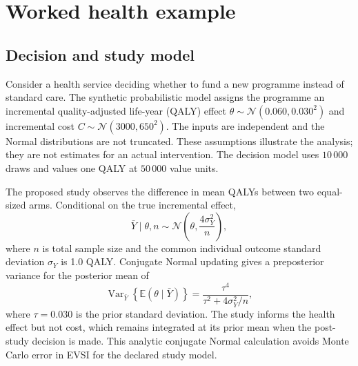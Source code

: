 \section{Worked health example}

\subsection{Decision and study model}

Consider a health service deciding whether to fund a new programme instead of
standard care. The synthetic probabilistic model assigns the programme an
incremental quality-adjusted life-year (QALY) effect
$\theta\sim\mathcal{N}(0.060,0.030^2)$ and incremental cost
$C\sim\mathcal{N}(3000,650^2)$. The inputs are independent and the Normal
distributions are not truncated. These assumptions illustrate the analysis;
they are not estimates for an actual intervention. The decision model uses
$10\,000$ draws and values one QALY at $50\,000$ value units.

The proposed study observes the difference in mean QALYs between two
equal-sized arms. Conditional on the true incremental effect,
\begin{equation}\label{eq:health-likelihood}
  \bar{Y}\mid\theta,n \sim
  \mathcal{N}\!\left(\theta,\frac{4\sigma_Y^2}{n}\right),
\end{equation}
where $n$ is total sample size and the common individual outcome standard
deviation $\sigma_Y$ is 1.0 QALY\@. Conjugate Normal updating gives a
preposterior variance for the posterior mean of
\begin{equation}\label{eq:health-preposterior}
  \operatorname{Var}_{\bar{Y}}
  \!\left\{\mathbb{E}(\theta\mid\bar{Y})\right\}
  =
  \frac{\tau^4}{\tau^2+4\sigma_Y^2/n},
\end{equation}
where $\tau=0.030$ is the prior standard deviation. The study informs the
health effect but not cost, which remains integrated at its prior mean when
the post-study decision is made. This analytic conjugate Normal calculation
avoids Monte Carlo error in EVSI for the declared study model.

